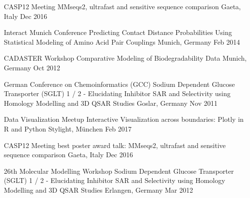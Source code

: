 

\begin{cvhonors}

  \cvhonor
    {CASP12 Meeting} %
    {MMseqs2, ultrafast and sensitive sequence comparison} %
    {Gaeta, Italy} %
    {Dec 2016} %

  \cvhonor
    {Interact Munich Conference} %
    {Predicting Contact Distance Probabilities Using Statistical Modeling of Amino Acid Pair Couplings} %
    {Munich, Germany} %
    {Feb 2014} %
    
  \cvhonor
    {CADASTER Workshop} %
    {Comparative Modeling of Biodegradability Data} %
    {Munich, Germany} %
    {Oct 2012} %

  \cvhonor
    {German Conference on Chemoinformatics (GCC)} %
    {Sodium Dependent Glucose Transporter (SGLT) 1 / 2 - Elucidating Inhibitor SAR and Selectivity using Homology Modelling and 3D QSAR Studies} %
    {Goslar, Germany} %
    {Nov 2011} %
    
    
       
    
\end{cvhonors}


\begin{cvhonors}
  \cvhonor
    {Data Visualization Meetup} %
    {Interactive Visualization across boundaries: Plotly in R and Python} %
    {Stylight,  München} %
    {Feb 2017} %
    
  \cvhonor
    {CASP12 Meeting} %
    {best poster award talk: MMseqs2, ultrafast and sensitive sequence comparison} %
    {Gaeta, Italy} %
    {Dec 2016} %
 
  \cvhonor
    {26th Molecular Modelling Workshop} %
    {Sodium Dependent Glucose Transporter (SGLT) 1 / 2 - Elucidating Inhibitor SAR and Selectivity using Homology Modelling and 3D QSAR Studies} %
    {Erlangen, Germany} %
    {Mar 2012} %
 
\end{cvhonors}

